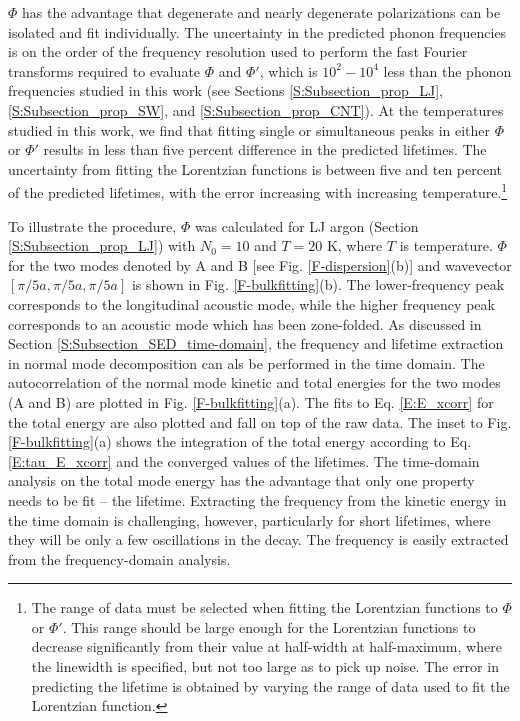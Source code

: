 $\Phi$ has the advantage that degenerate and nearly degenerate 
polarizations can be isolated and fit individually. The uncertainty 
in the predicted phonon frequencies is 
on the order of the frequency resolution used to perform the fast 
Fourier transforms required to evaluate $\Phi$ and $\Phi'$, which is 
$10^2-10^4$ less than the phonon frequencies 
studied in this work (see Sections \ref{S:Subsection_prop_LJ}, 
\ref{S:Subsection_prop_SW}, 
and \ref{S:Subsection_prop_CNT}). At the temperatures studied in this work, 
we find that 
fitting single or simultaneous peaks in either $\Phi$ or $\Phi'$ results 
in less than five 
percent difference in the predicted lifetimes. The uncertainty from 
fitting the Lorentzian 
functions is between five and ten percent of the predicted lifetimes, 
with the error increasing 
with increasing temperature.\footnote{The range of data must be 
selected when fitting the 
Lorentzian functions to $\Phi$ or $\Phi'$. This range should be large 
enough for the Lorentzian 
functions to decrease significantly from their value at
half-width at half-maximum, where the linewidth is specified, but not 
too large as to pick up 
noise. The error in predicting the lifetime is obtained by varying the 
range of data
used to fit the Lorentzian function.}

To illustrate the procedure, $\Phi$ was calculated for LJ argon (Section 
\ref{S:Subsection_prop_LJ}) with $N_0=10$ and $T=20$ K, where $T$ is 
temperature. $\Phi$ for the two modes denoted by A and B 
[see Fig. \ref{F-dispersion}(b)] 
and wavevector $[\pi/5a,\pi/5a,\pi/5a]$ 
is shown in Fig$.$ \ref{F-bulkfitting}(b). The lower-frequency peak 
corresponds to the longitudinal acoustic mode,
\cite{dove_introduction_1993} while the higher 
frequency peak corresponds to an acoustic mode which has been 
zone-folded. 
As discussed in Section \ref{S:Subsection_SED_time-domain}, the frequency 
and lifetime extraction in normal mode decomposition can als be performed 
in the time domain. The autocorrelation of the normal 
mode kinetic and total energies for the two modes (A and B) 
are plotted in Fig. \ref{F-bulkfitting}(a). The fits to 
Eq. \eqref{E:E_xcorr} for the total energy are also plotted and 
fall on top of the raw data.  The inset to Fig. \ref{F-bulkfitting}(a) 
shows the integration of the total energy according to 
Eq. \eqref{E:tau_E_xcorr} and the converged values of the lifetimes. 
The time-domain analysis on the total mode 
energy has the advantage that only one property needs to be fit -- 
the lifetime. Extracting the frequency from the kinetic energy in the 
time domain is challenging, however, particularly for short lifetimes, 
where they will be only a few oscillations in the decay. The frequency 
is easily extracted from the frequency-domain analysis.

